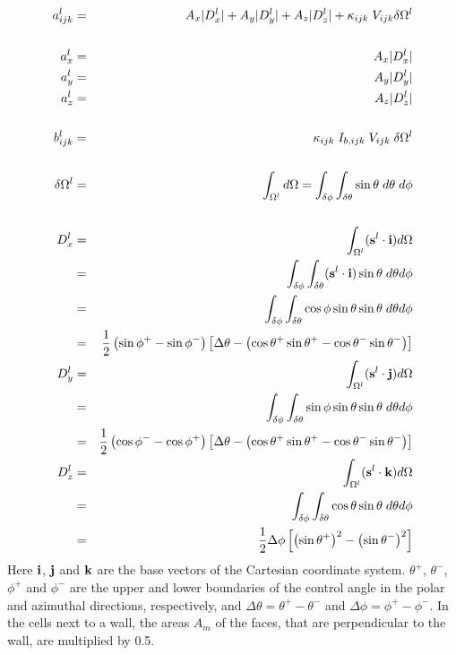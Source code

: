 \documentclass[11pt]{book}
\begin{document}
\begin{eqnarray}
  a_{ijk}^l & = & A_x |D_x^l| + A_y |D_y^l| +A_z |D_z^l| +
        \kappa_{ijk} \; V_{ijk} \delta\Omega^l \\
  \nonumber \\
  a_{x}^l & = & A_x |D_x^l| \\
  a_{y}^l & = & A_y |D_y^l| \\
  a_{z}^l & = & A_z |D_z^l| \\
  \nonumber \\
  b_{ijk}^l & = &
  \kappa_{ijk} \; I_{b,ijk} \; V_{ijk} \; \delta\Omega^l \\
  \nonumber \\
  \delta \Omega^l & = & \int_{\Omega^l}d\Omega
          = \int_{{\delta\phi}}\int_{{\delta\theta}} \sin\theta \; d\theta \; d\phi \\
  \nonumber \\
   D_x^l & = & \int_{\Omega^l}({\bf s}^l\cdot {\bf i})d\Omega \\
         & = & \int_{{\delta\phi}}\int_{{\delta\theta}} ({\bf s}^l\cdot{\bf i})
                        \sin\theta \; d\theta d\phi \nonumber \\
         & = & \int_{{\delta\phi}}\int_{{\delta\theta}} \cos\phi\sin\theta\sin\theta\;
                        d\theta d\phi \nonumber \\
         & = & \frac{1}{2}\left( \sin\phi^+ - \sin\phi^- \right)
               \left[\Delta\theta - \left(\cos\theta^+\sin\theta^+
                          - \cos\theta^-\sin\theta^-\right)\right] \nonumber \\
   D_y^l & = & \int_{\Omega^l}({\bf s}^l\cdot {\bf j})d\Omega \\
         & = & \int_{{\delta\phi}}\int_{{\delta\theta}} \sin\phi\sin\theta\sin\theta\;
                        d\theta d\phi \nonumber \\
         & = & \frac{1}{2}\left( \cos\phi^- - \cos\phi^+ \right)
               \left[\Delta\theta - \left(\cos\theta^+\sin\theta^+
                          - \cos\theta^-\sin\theta^-\right)\right]\nonumber \\
   D_z^l & = & \int_{\Omega^l}({\bf s}^l\cdot {\bf k})d\Omega \\
         & = & \int_{{\delta\phi}}\int_{{\delta\theta}} \cos\theta\sin\theta\;
                        d\theta d\phi \nonumber \\
         & = & \frac{1}{2}\Delta\phi
               \left[\left(\sin\theta^+\right)^2 -
                     \left(\sin\theta^-\right)^2\right] \nonumber
\end{eqnarray}
Here $\bf i$, $\bf j$ and $\bf k$ are the base vectors of the
Cartesian coordinate system. $\theta^+$, $\theta^-$, $\phi^+$ and
$\phi^-$ are the upper and lower boundaries of the control angle in
the polar and azimuthal directions, respectively, and $\Delta\theta =
\theta^+ - \theta^-$ and $\Delta\phi = \phi^+ - \phi^-$. In the cells
next to a wall, the areas $A_m$ of the faces, that are perpendicular to
the wall, are multiplied by 0.5.
\end{document}
